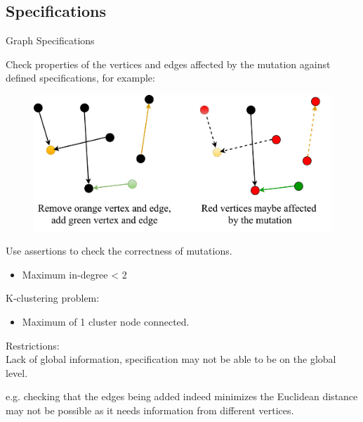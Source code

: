 \subsection{Specifications}
\begin{frame}{Graph Specifications}

Check properties of the vertices and edges affected by the mutation against
defined specifications, for example:

\begin{figure}
\includegraphics[width=0.8\linewidth]{figures/fig-specification1.pdf}
\end{figure}

Use assertions to check the correctness of mutations.

\begin{itemize}
  \item Maximum in-degree < 2
\end{itemize}

\end{frame}


\begin{frame}
K-clustering problem:
\begin{itemize}
  \item Maximum of 1 cluster node connected.  
\end{itemize}

Restrictions:\\
  Lack of global information, specification may not be able to be on the
  global level.
  
  e.g. checking that the edges being added indeed minimizes the Euclidean
  distance may not be possible as it needs information from different vertices.
\end{frame}

